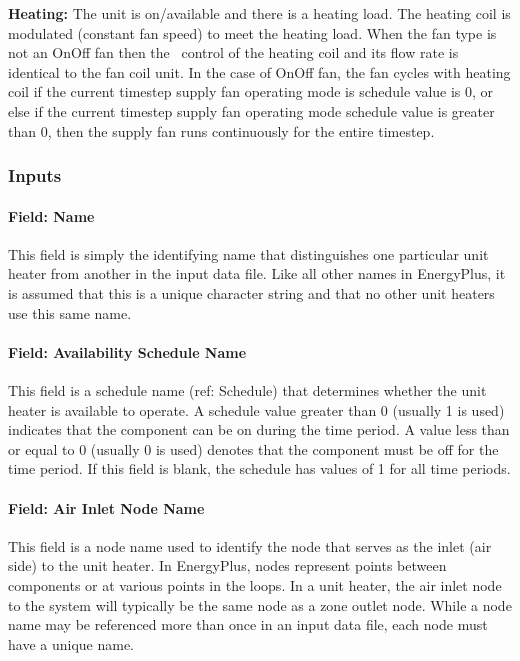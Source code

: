 \textbf{Heating:} The unit is on/available and there is a heating load. The heating coil is modulated (constant fan speed) to meet the heating load. When the fan type is not an OnOff fan then the~ control of the heating coil and its flow rate is identical to the fan coil unit. In the case of OnOff fan, the fan cycles with heating coil if the current timestep supply fan operating mode is schedule value is 0, or else if the current timestep supply fan operating mode schedule value is greater than 0, then the supply fan runs continuously for the entire timestep.

\subsubsection{Inputs}\label{inputs-3-043}

\paragraph{Field: Name}\label{field-name-3-039}

This field is simply the identifying name that distinguishes one particular unit heater from another in the input data file. Like all other names in EnergyPlus, it is assumed that this is a unique character string and that no other unit heaters use this same name.

\paragraph{Field: Availability Schedule Name}\label{field-availability-schedule-name-3-007}

This field is a schedule name (ref: Schedule) that determines whether the unit heater is available to operate. A schedule value greater than 0 (usually 1 is used) indicates that the component can be on during the time period. A value less than or equal to 0 (usually 0 is used) denotes that the component must be off for the time period. If this field is blank, the schedule has values of 1 for all time periods.

\paragraph{Field: Air Inlet Node Name}\label{field-air-inlet-node-name-2-003}

This field is a node name used to identify the node that serves as the inlet (air side) to the unit heater. In EnergyPlus, nodes represent points between components or at various points in the loops. In a unit heater, the air inlet node to the system will typically be the same node as a zone outlet node. While a node name may be referenced more than once in an input data file, each node must have a unique name.

